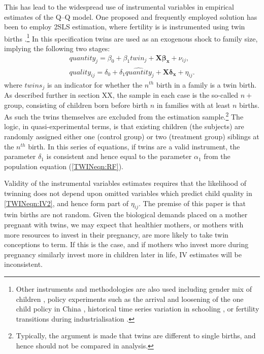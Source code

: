 \documentclass[subeqn]{article}
\begin{document}
\begin{spacing}{1.4}
This has lead to the widespread use of instrumental variables in empirical
estimates of the Q--Q model.  One proposed and frequently employed solution has
been to employ 2SLS estimation, where fertility is is instrumented using twin
births \citep{RosenzweigWolpin1980}.\footnote{Other instruments and methodologies
  are also used including gender mix of children \citep{ConleyGlauber2006}, policy
  experiments such as the arrival and loosening of the one child policy in China
  \citep{Qian2009,ArgysAverett2015}, historical time series variation in schooling
  \citep{BleakleyLange2009}, or fertility transitions during industrialisation
  \citep{DalgaardStrulik2015}.}  In this specification twins are used as an
exogenous shock to family size, implying the following two stages:
\begin{subequations}
  \begin{eqnarray}
    \label{TWINeqn:IV1}
    quantity_{j}=\beta_0+\beta_1 twin_{j} + \bm{X}\bm{\beta_x}+\nu_{ij}, \\ \label{TWINeqn:IV2}
    quality_{ij}=\delta_0 + \delta_1 \widehat{quantity}_j + \bm{X}\bm{\delta_x}+\eta_{ij}.
  \end{eqnarray}
\end{subequations}
where $twins_j$ is an indicator for whether the $n^{th}$ birth in a family is a
twin birth. As described further in section XX, the sample
in each case is the so-called $n+$ group, consisting of children born before
birth $n$ in families with at least $n$ births. As such the twins themselves are
excluded from the estimation sample.\footnote{Typically, the argument is made
  that twins are different to single births, and hence should not be compared in
  analysis.} The logic, in quasi-experimental terms, is that existing children
(the subjects) are randomly assigned either one (control group) or two
(treatment group) siblings at the $n^{th}$ birth.  In this series of equations,
if twins are a valid instrument, the parameter $\delta_1$ is consistent and hence
equal to the parameter $\alpha_1$ from the population equation
(\ref{TWINeqn:RF}).

Validity of the instrumental variables estimates requires that the likelihood
of twinning does not depend upon omitted variables which predict child quality
in \ref{TWINeqn:IV2}, and hence form part of $\eta_{ij}$.  The premise of this
paper is that twin births are not
random. Given the biological demands placed on a mother pregnant with twins,
we may expect that healthier mothers, or mothers with more resources to invest
in their pregnancy, are more likely to take twin conceptions to term.  If
this is the case, and if mothers who invest more during pregnancy similarly
invest more in children later in life, IV estimates will be inconsistent.


\end{spacing}
\end{document}
